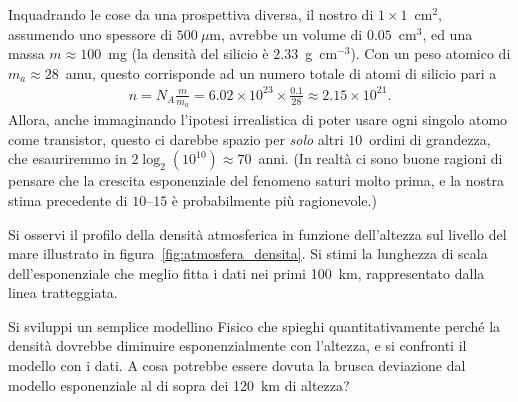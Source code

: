 \begin{solution}
Inquadrando le cose da una prospettiva diversa, il nostro  di
$1 \times 1$~cm$^2$, assumendo uno spessore di $500~\mu$m, avrebbe un volume di
$0.05$~cm$^3$, ed una massa $m \approx 100$~mg (la densità del silicio è $2.33$~g~cm$^{-3}$).
Con un peso atomico di $m_a \approx 28$~amu, questo corrisponde ad un numero totale
di atomi di silicio pari a
\begin{align*}
  n = N_A \frac{m}{m_a} = 6.02 \times 10^{23} \times \frac{0.1}{28} \approx 2.15 \times 10^{21}.
\end{align*}
Allora, anche immaginando l'ipotesi irrealistica di poter usare ogni singolo atomo
come transistor, questo ci darebbe spazio per \emph{solo} altri $10$~ordini di
grandezza, che esauriremmo in $2 \log_2(10^{10}) \approx 70$~anni. (In realtà
ci sono buone ragioni di pensare che la crescita esponenziale del fenomeno saturi
molto prima, e la nostra stima precedente di $10$--$15$ è probabilmente più
ragionevole.)

\end{solution}



\begin{exercise}\label{ex:atmosfera_exp}

Si osservi il profilo della densità atmosferica in funzione dell'altezza sul
livello del mare illustrato in figura~\ref{fig:atmosfera_densita}. Si stimi
la lunghezza di scala dell'esponenziale che meglio fitta i dati nei primi 100~km,
rappresentato dalla linea tratteggiata.


Si sviluppi un semplice modellino Fisico
che spieghi quantitativamente perché la densità dovrebbe diminuire
esponenzialmente con l'altezza, e si confronti il modello con i dati. A cosa
potrebbe essere dovuta la brusca deviazione dal modello esponenziale al di sopra
dei 120~km di altezza?

\end{exercise}



